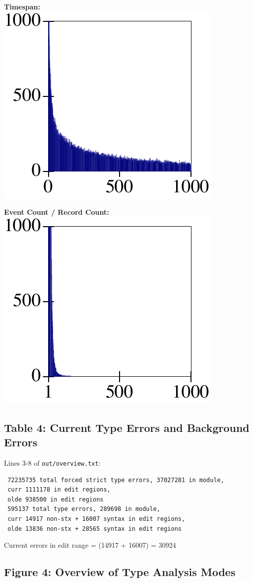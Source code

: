 \documentclass{article}
\begin{document}
\begin{minipage}{0.5\columnwidth}
  \textbf{Timespan:}\\
  \includegraphics[width=0.4\columnwidth]{out/timespan-distribution.pdf}
\end{minipage}\begin{minipage}{0.5\columnwidth}
  \textbf{Event Count / Record Count:}\\
  \includegraphics[width=0.4\columnwidth]{out/event-count-distribution.pdf}
\end{minipage}


\subsection*{Table 4: Current Type Errors and Background Errors}

Lines 3-8 of \texttt{out/overview.txt}:

\begin{verbatim}
 72235735 total forced strict type errors, 37027281 in module,
 curr 1111178 in edit regions,
 olde 938500 in edit regions
 595137 total type errors, 289698 in module,
 curr 14917 non-stx + 16007 syntax in edit regions,
 olde 13836 non-stx + 28565 syntax in edit regions
\end{verbatim}

Current errors in edit range = (14917 + 16007) = 30924


\subsection*{Figure 4: Overview of Type Analysis Modes}
\end{document}
